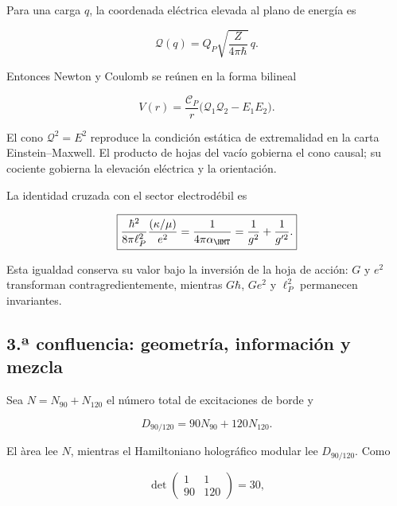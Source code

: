 Para una carga \(q\), la coordenada el\'ectrica elevada al plano de energ\'ia
es

\begin{equation}
 \mathcal Q(q)=Q_P\sqrt{\frac{Z}{4\pi\hbar}}\,q.
 \label{rm:eq:confluence-electric-coordinate}
\end{equation}

Entonces Newton y Coulomb se re\'unen en la forma bilineal

\begin{equation}
 \boxed{
 V(r)=\frac{\mathscr C_P}{r}
 \bigl(\mathcal Q_1\mathcal Q_2-E_1E_2\bigr).}
 \label{rm:eq:confluence-newton-coulomb}
\end{equation}

El cono \(\mathcal Q^2=E^2\) reproduce la condici\'on est\'atica de
extremalidad en la carta Einstein--Maxwell.  El producto de hojas del vac\'io
gobierna el cono causal; su cociente gobierna la elevaci\'on el\'ectrica y la
orientaci\'on.

La identidad cruzada con el sector electrod\'ebil es

\begin{equation}
 \boxed{
 \frac{\hbar^2}{8\pi\ell_P^2}
 \frac{(\kappa/\mu)}{e^2}
 =\frac1{4\pi\alpha_{\HMT}}
 =\frac1{g^2}+\frac1{g'^2}.}
 \label{rm:eq:confluence-einstein-maxwell-ew}
\end{equation}

Esta igualdad conserva su valor bajo la inversi\'on de la hoja de acci\'on:
\(G\) y \(e^2\) transforman contragredientemente, mientras
\(G\hbar\), \(Ge^2\) y \(\ell_P^2\) permanecen invariantes.

\subsection{3.ª confluencia: geometría, información y mezcla}

Sea \(N=N_{90}+N_{120}\) el n\'umero total de excitaciones de borde y

\begin{equation}
 D_{90/120}=90N_{90}+120N_{120}.
 \label{rm:eq:confluence-modular-provenance}
\end{equation}

El \`area lee \(N\), mientras el Hamiltoniano hologr\'afico modular lee
\(D_{90/120}\). Como

\begin{equation}
 \det\begin{pmatrix}1&1\\90&120\end{pmatrix}=30,
 \label{rm:eq:confluence-modular-determinant}
\end{equation}

